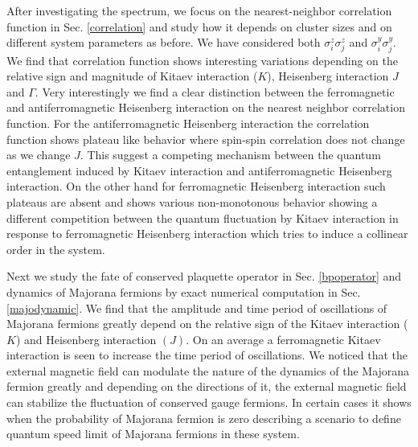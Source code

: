 \documentclass[aps,amsmath,twocolumn,amssymb,floatfix,showpacs,superscriptaddress,nofootinbib,longbibliography]{revtex4-1}
\begin{document}
After investigating the spectrum, we focus on the nearest-neighbor correlation function in Sec. \ref{correlation} and study how it depends on cluster sizes and on different system parameters as before. We have considered both $\sigma^z_i \sigma^z_j$ and $\sigma^y_i \sigma^y_j$. We find that correlation function shows interesting variations
depending on the relative sign and magnitude of Kitaev interaction ($K$), Heisenberg interaction $J$ and $\Gamma$.
Very interestingly we find a clear distinction between the ferromagnetic and antiferromagnetic Heisenberg interaction on the nearest neighbor correlation function. For the antiferromagnetic Heisenberg interaction the
correlation function shows plateau like behavior where spin-spin correlation does not change as we change $J$.
This suggest a competing mechanism between the quantum entanglement induced by Kitaev interaction and antiferromagnetic Heisenberg interaction. On the other hand for ferromagnetic Heisenberg interaction such plateaus are absent and shows various non-monotonous behavior showing a different competition between the quantum fluctuation by Kitaev interaction in response to ferromagnetic Heisenberg interaction which tries to induce a collinear order in the system. \\
\indent
  

Next we study the fate of conserved plaquette operator in Sec. \ref{bpoperator} and dynamics of Majorana fermions by exact numerical computation in Sec. \ref{majodynamic}. We find that the amplitude and time period of oscillations of Majorana fermions greatly depend on the relative sign of the Kitaev interaction ($K$) and Heisenberg interaction $(J)$. On an average a ferromagnetic Kitaev interaction is seen to increase the time period of oscillations. We noticed that the external magnetic field can modulate the nature of the dynamics of the Majorana fermion greatly and depending on the directions of it, the external magnetic field can stabilize the fluctuation of conserved gauge fermions. In certain cases it shows when the probability of Majorana fermion is zero describing a scenario to define quantum speed limit of Majorana fermions in these system. \\                                                                                                                                                             
\indent
\end{document}
